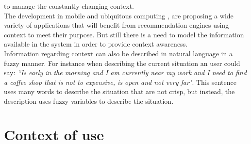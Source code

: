 to manage the constantly changing context. \\ 
The development in mobile and ubiquitous 
computing \cite{noguera2012mobile} \cite{chiou2010adaptive}, are 
proposing a wide variety of applications that will benefit 
from recommendation engines using context to meet their
purpose. But still there is a need to model the information 
available in the system in order to provide context awareness.\\  
Information regarding context can also be described in natural 
language in a fuzzy manner. For instance when describing 
the current situation an user could say: \textit{``Is early in
the morning and I am currently near my work and I need to 
find a coffee shop that is not to expensive, is open 
and not very far"}. This sentence uses many words to describe 
the situation that are not crisp, but instead, the description 
uses fuzzy variables to describe the situation.  

\section{Context of use}\label{contextofuse}

